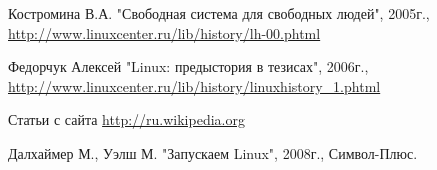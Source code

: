\begin{thebibliography}{99}
	 Костромина В.А. "Свободная система для свободных людей", 2005г.,
	\href{http://www.linuxcenter.ru/lib/history/lh-00.phtml}{http://www.linuxcenter.ru/lib/history/lh-00.phtml}
	
	 Федорчук Алексей "Linux: предыстория в тезисах", 2006г.,
	\href{http://www.linuxcenter.ru/lib/history/linuxhistory_1.phtml}{http://www.linuxcenter.ru/lib/history/linuxhistory\_1.phtml}
	
	 Статьи с сайта
	\href{http://ru.wikipedia.org}{http://ru.wikipedia.org}
	
	 Далхаймер М., Уэлш М. "Запускаем Linux", 2008г., Символ-Плюс.
	
\end{thebibliography}